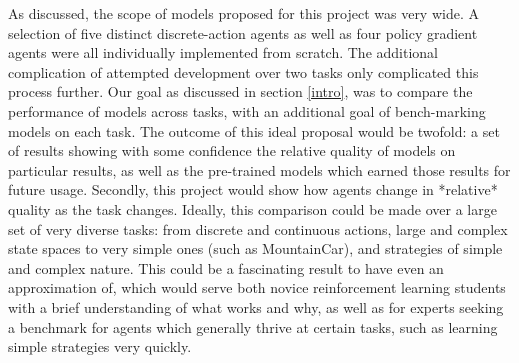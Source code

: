 \documentclass[conference]{IEEEtran}
\begin{document}
As discussed, the scope of models proposed for this project was very wide. A selection of five distinct discrete-action agents as well as four policy gradient agents were all individually implemented from scratch. The additional complication of attempted development over two tasks only complicated this process further. Our goal as discussed in section \ref{intro}, was to compare the performance of models across tasks, with an additional goal of bench-marking models on each task. The outcome of this ideal proposal would be twofold: a set of results showing with some confidence the relative quality of models on particular results, as well as the pre-trained models which earned those results for future usage. Secondly, this project would show how agents change in *relative* quality as the task changes. Ideally, this comparison could be made over a large set of very diverse tasks: from discrete and continuous actions, large and complex state spaces to very simple ones (such as MountainCar), and strategies of simple and complex nature. This could be a fascinating result to have even an approximation of, which would serve both novice reinforcement learning students with a brief understanding of what works and why, as well as for experts seeking a benchmark for agents which generally thrive at certain tasks, such as learning simple strategies very quickly.

{}


\vspace{12pt}
\end{document}
